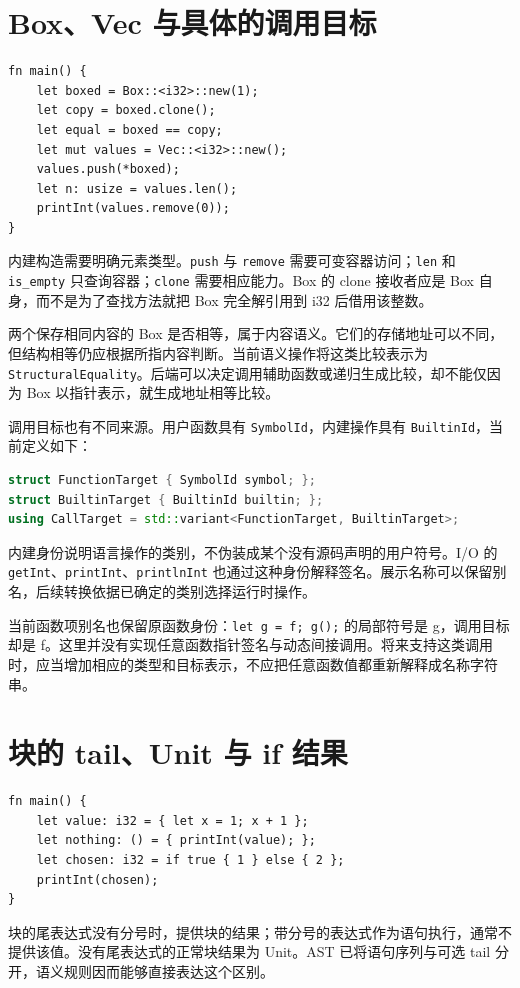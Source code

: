 \section{Box、Vec 与具体的调用目标}
\begin{lstlisting}[language=Rustless]
fn main() {
    let boxed = Box::<i32>::new(1);
    let copy = boxed.clone();
    let equal = boxed == copy;
    let mut values = Vec::<i32>::new();
    values.push(*boxed);
    let n: usize = values.len();
    printInt(values.remove(0));
}
\end{lstlisting}
内建构造需要明确元素类型。\lstinline[language=Rustless]|push| 与 \lstinline[language=Rustless]|remove| 需要可变容器访问；\lstinline[language=Rustless]|len| 和 \lstinline[language=Rustless]|is_empty| 只查询容器；\lstinline[language=Rustless]|clone| 需要相应能力。Box 的 clone 接收者应是 Box 自身，而不是为了查找方法就把 Box 完全解引用到 i32 后借用该整数。

两个保存相同内容的 Box 是否相等，属于内容语义。它们的存储地址可以不同，但结构相等仍应根据所指内容判断。当前语义操作将这类比较表示为 \texttt{StructuralEquality}。后端可以决定调用辅助函数或递归生成比较，却不能仅因为 Box 以指针表示，就生成地址相等比较。

调用目标也有不同来源。用户函数具有 \texttt{SymbolId}，内建操作具有 \texttt{BuiltinId}，当前定义如下：
\begin{lstlisting}[language=C++]
struct FunctionTarget { SymbolId symbol; };
struct BuiltinTarget { BuiltinId builtin; };
using CallTarget = std::variant<FunctionTarget, BuiltinTarget>;
\end{lstlisting}
内建身份说明语言操作的类别，不伪装成某个没有源码声明的用户符号。I/O 的 \lstinline[language=Rustless]|getInt|、\lstinline[language=Rustless]|printInt|、\lstinline[language=Rustless]|printlnInt| 也通过这种身份解释签名。展示名称可以保留别名，后续转换依据已确定的类别选择运行时操作。

当前函数项别名也保留原函数身份：\lstinline[language=Rustless]|let g = f; g();| 的局部符号是 g，调用目标却是 f。这里并没有实现任意函数指针签名与动态间接调用。将来支持这类调用时，应当增加相应的类型和目标表示，不应把任意函数值都重新解释成名称字符串。

\section{块的 tail、Unit 与 if 结果}
\begin{lstlisting}[language=Rustless]
fn main() {
    let value: i32 = { let x = 1; x + 1 };
    let nothing: () = { printInt(value); };
    let chosen: i32 = if true { 1 } else { 2 };
    printInt(chosen);
}
\end{lstlisting}
块的尾表达式没有分号时，提供块的结果；带分号的表达式作为语句执行，通常不提供该值。没有尾表达式的正常块结果为 Unit。AST 已将语句序列与可选 tail 分开，语义规则因而能够直接表达这个区别。

